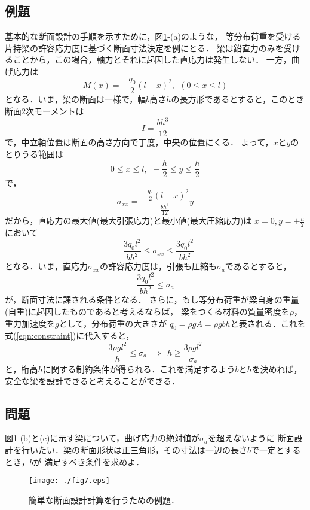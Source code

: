 \documentclass[10pt,a4j]{jbook}
\begin{document}
\subsection{例題}
基本的な断面設計の手順を示すために，図\ref{fig:fig13_7}-(a)のような，
等分布荷重を受ける片持梁の許容応力度に基づく断面寸法決定を例にとる．
梁は鉛直力のみを受けることから，この場合，軸力とそれに起因した直応力は発生しない．
一方，曲げ応力は
\begin{equation}
	M(x)=-\frac{q_0}{2}(l-x)^2, \ \ (0 \leq x \leq l)  
\end{equation}
となる．いま，梁の断面は一様で，幅$b$高さ$h$の長方形であるとすると，このとき
断面2次モーメントは
\begin{equation}
	I=\frac{bh^3}{12}
\end{equation}
で，中立軸位置は断面の高さ方向で丁度，中央の位置にくる．
よって，$x$と$y$のとりうる範囲は
\begin{equation}
	0 \leq  x \leq l, \ \ 
	-\frac{h}{2} \leq  y \leq \frac{h}{2} 
\end{equation}
で，
\begin{equation}
	\sigma_{xx}=\frac{-\frac{q_0}{2}(l-x)^2}{\frac{bh^3}{12}}y
\end{equation}
だから，直応力の最大値(最大引張応力)と最小値(最大圧縮応力)は
$x=0, y=\pm \frac{h}{2}$において
\begin{equation}
	-\frac{3q_0l^2}{bh^2}
	\leq \sigma_{xx} \leq 
	\frac{3q_0l^2}{bh^2}
\end{equation}
となる．いま，直応力$\sigma_{xx}$の許容応力度は，引張も圧縮も$\sigma_a$であるとすると，
\begin{equation}
	\frac{3q_0l^2}{bh^2} \leq \sigma_a
	\label{eqn:constraint}
\end{equation}
が，断面寸法に課される条件となる．
さらに，もし等分布荷重が梁自身の重量(自重)に起因したものであると考えるならば，
梁をつくる材料の質量密度を$\rho$，重力加速度を$g$として，分布荷重の大きさが
$q_0=\rho g A=\rho gbh$と表される．これを式(\ref{eqn:constraint})に代入すると，
\begin{equation}
	\frac{3\rho g l^2}{h} \leq \sigma_a \ \ 
	\Rightarrow 
	\ \ 
	h \geq \frac{3\rho g l^2}{\sigma_a}
\end{equation}
と，桁高$h$に関する制約条件が得られる．これを満足するよう$b$と$h$を決めれば，
安全な梁を設計できると考えることができる．
\subsection{問題}
図\ref{fig:fig13_7}-(b)と(c)に示す梁について，曲げ応力の絶対値が$\sigma_a$を超えないように
断面設計を行いたい．梁の断面形状は正三角形，その寸法は一辺の長さ$b$で一定とするとき，$b$が
満足すべき条件を求めよ．
\begin{figure}[h]
	\begin{center}
	\texttt{[image: ./fig7.eps]} 
	\end{center}
	\caption{
		簡単な断面設計計算を行うための例題．
	} 
	\label{fig:fig13_7}
\end{figure}
\end{document}
